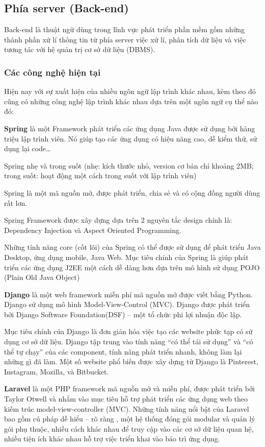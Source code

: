 \subsection{Phía server (Back-end)}
Back-end là thuật ngữ dùng trong lĩnh vực phát triển phần mềm gồm những thành phần xử lí thông tin từ phía server việc xử lí, phân tích dữ liệu và việc tương tác với hệ quản trị cơ sở dữ liệu (DBMS).
\subsubsection{Các công nghệ hiện tại}
Hiện nay với sự xuất hiện của nhiều ngôn ngữ lập trình khác nhau, kèm theo đó cũng có những công nghệ lập trình khác nhau dựa trên một ngôn ngữ cụ thể nào đó:

\textbf{Spring} là một Framework phát triển các ứng dụng Java được sử dụng bởi hàng triệu lập trình viên. Nó giúp tạo các ứng dụng có hiệu năng cao, dễ kiểm thử, sử dụng lại code…

Spring nhẹ và trong suốt (nhẹ: kích thước nhỏ, version cơ bản chỉ khoảng 2MB; trong suốt: hoạt động một cách trong suốt với lập trình viên)

Spring là một mã nguồn mở, được phát triển, chia sẻ và có cộng đồng người dùng rất lơn.

Spring Framework được xây dựng dựa trên 2 nguyên tắc design chính là: Dependency Injection và Aspect Oriented Programming.

Những tính năng core (cốt lõi) của Spring có thể được sử dụng để phát triển Java Desktop, ứng dụng mobile, Java Web. Mục tiêu chính của Spring là giúp phát triển các ứng dụng J2EE một cách dễ dàng hơn dựa trên mô hình sử dụng POJO (Plain Old Java Object)

\textbf{Django} là một web framework miễn phí mã nguồn mở được viết bằng Python. Django sử dụng mô hình Model-View-Control (MVC). Django được phát triển bởi Django Software Foundation(DSF) – một tổ chức phi lợi nhuận độc lập.

Mục tiêu chính của Django là đơn giản hóa việc tạo các website phức tạp có sử dụng cơ sở dữ liệu. Django tập trung vào tính năng “có thể tái sử dụng” và “có thể tự chạy” của các component, tính năng phát triển nhanh, không làm lại những gì đã làm. Một số website phổ biến được xây dựng từ Django là Pinterest, Instagram, Mozilla, và Bitbucket.

\textbf{Laravel} là một PHP framework  mã nguồn mở và miễn phí, được phát triển bởi Taylor Otwell và nhắm vào mục tiêu hỗ trợ phát triển các ứng dụng web theo kiếm trúc model-view-controller (MVC). Những tính năng nổi bật của Laravel bao gồm cú pháp dễ hiểu – rõ ràng , một hệ thống đóng gói modular và quản lý gói phụ thuộc, nhiều cách khác nhau để truy cập vào các cơ sở dữ liệu quan hệ, nhiều tiện ích khác nhau hỗ trợ việc triển khai vào bảo trì ứng dụng.

